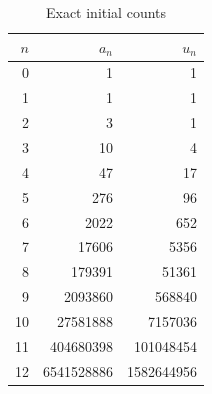 \begin{table}[htbp]\centering
\caption{Exact initial counts}\label{tab:exact}
\begin{tabular}{r r r}\toprule
$n$ & $a_n$ & $u_n$ \\\midrule
0 & 1 & 1 \\
1 & 1 & 1 \\
2 & 3 & 1 \\
3 & 10 & 4 \\
4 & 47 & 17 \\
5 & 276 & 96 \\
6 & 2022 & 652 \\
7 & 17606 & 5356 \\
8 & 179391 & 51361 \\
9 & 2093860 & 568840 \\
10 & 27581888 & 7157036 \\
11 & 404680398 & 101048454 \\
12 & 6541528886 & 1582644956 \\
\bottomrule\end{tabular}\end{table}
